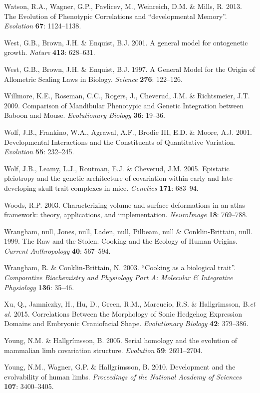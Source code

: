 \documentclass[12pt,twoside]{report}
\begin{document}
Watson, R.A., Wagner, G.P., Pavlicev, M., Weinreich, D.M. \& Mills, R.
2013. The Evolution of Phenotypic Correlations and ``developmental
Memory''. \emph{Evolution} \textbf{67}: 1124--1138.

West, G.B., Brown, J.H. \& Enquist, B.J. 2001. A general model for
ontogenetic growth. \emph{Nature} \textbf{413}: 628--631.

West, G.B., Brown, J.H. \& Enquist, B.J. 1997. A General Model for the
Origin of Allometric Scaling Laws in Biology. \emph{Science}
\textbf{276}: 122--126.

Willmore, K.E., Roseman, C.C., Rogers, J., Cheverud, J.M. \&
Richtsmeier, J.T. 2009. Comparison of Mandibular Phenotypic and Genetic
Integration between Baboon and Mouse. \emph{Evolutionary Biology}
\textbf{36}: 19--36.

Wolf, J.B., Frankino, W.A., Agrawal, A.F., Brodie III, E.D. \& Moore,
A.J. 2001. Developmental Interactions and the Constituents of
Quantitative Variation. \emph{Evolution} \textbf{55}: 232--245.

Wolf, J.B., Leamy, L.J., Routman, E.J. \& Cheverud, J.M. 2005. Epistatic
pleiotropy and the genetic architecture of covariation within early and
late-developing skull trait complexes in mice. \emph{Genetics}
\textbf{171}: 683--94.

Woods, R.P. 2003. Characterizing volume and surface deformations in an
atlas framework: theory, applications, and implementation.
\emph{NeuroImage} \textbf{18}: 769--788.

Wrangham, null, Jones, null, Laden, null, Pilbeam, null \&
Conklin-Brittain, null. 1999. The Raw and the Stolen. Cooking and the
Ecology of Human Origins. \emph{Current Anthropology} \textbf{40}:
567--594.

Wrangham, R. \& Conklin-Brittain, N. 2003. ``Cooking as a biological
trait''. \emph{Comparative Biochemistry and Physiology Part A: Molecular
\& Integrative Physiology} \textbf{136}: 35--46.

Xu, Q., Jamniczky, H., Hu, D., Green, R.M., Marcucio, R.S. \&
Hallgrimsson, B.\emph{et al.} 2015. Correlations Between the Morphology
of Sonic Hedgehog Expression Domains and Embryonic Craniofacial Shape.
\emph{Evolutionary Biology} \textbf{42}: 379--386.

Young, N.M. \& Hallgrímsson, B. 2005. Serial homology and the evolution
of mammalian limb covariation structure. \emph{Evolution} \textbf{59}:
2691--2704.

Young, N.M., Wagner, G.P. \& Hallgrímsson, B. 2010. Development and the
evolvability of human limbs. \emph{Proceedings of the National Academy
of Sciences} \textbf{107}: 3400--3405.
\end{document}
